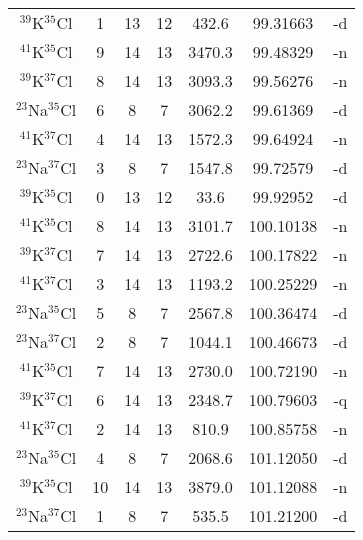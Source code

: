 \begin{table*}[htp]
\begin{tabular}{ccccccc}
$^{39}$K$^{35}$Cl & 1 & 13 & 12 & 432.6 & 99.31663 & -d \\
$^{41}$K$^{35}$Cl & 9 & 14 & 13 & 3470.3 & 99.48329 & -n \\
$^{39}$K$^{37}$Cl & 8 & 14 & 13 & 3093.3 & 99.56276 & -n \\
$^{23}$Na$^{35}$Cl & 6 & 8 & 7 & 3062.2 & 99.61369 & -d \\
$^{41}$K$^{37}$Cl & 4 & 14 & 13 & 1572.3 & 99.64924 & -n \\
$^{23}$Na$^{37}$Cl & 3 & 8 & 7 & 1547.8 & 99.72579 & -d \\
$^{39}$K$^{35}$Cl & 0 & 13 & 12 & 33.6 & 99.92952 & -d \\
$^{41}$K$^{35}$Cl & 8 & 14 & 13 & 3101.7 & 100.10138 & -n \\
$^{39}$K$^{37}$Cl & 7 & 14 & 13 & 2722.6 & 100.17822 & -n \\
$^{41}$K$^{37}$Cl & 3 & 14 & 13 & 1193.2 & 100.25229 & -n \\
$^{23}$Na$^{35}$Cl & 5 & 8 & 7 & 2567.8 & 100.36474 & -d \\
$^{23}$Na$^{37}$Cl & 2 & 8 & 7 & 1044.1 & 100.46673 & -d \\
$^{41}$K$^{35}$Cl & 7 & 14 & 13 & 2730.0 & 100.72190 & -n \\
$^{39}$K$^{37}$Cl & 6 & 14 & 13 & 2348.7 & 100.79603 & -q \\
$^{41}$K$^{37}$Cl & 2 & 14 & 13 & 810.9 & 100.85758 & -n \\
$^{23}$Na$^{35}$Cl & 4 & 8 & 7 & 2068.6 & 101.12050 & -d \\
$^{39}$K$^{35}$Cl & 10 & 14 & 13 & 3879.0 & 101.12088 & -n \\
$^{23}$Na$^{37}$Cl & 1 & 8 & 7 & 535.5 & 101.21200 & -d \\
\hline
\end{tabular}

\par 
\end{table*}
